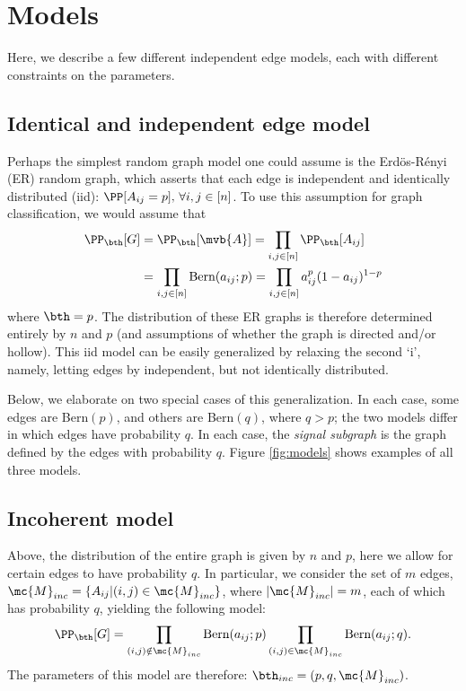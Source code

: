 \section{Models} %
\label{sub:models}

Here, we describe a few different independent edge models, each with different constraints on the parameters.


\subsection{Identical and independent edge model} %
\label{sub:ER}


Perhaps the simplest random graph model one could assume is the Erd\"os-R\'enyi (ER) random graph, which asserts that each edge is independent and identically distributed (iid): $\PP[A_{ij}=p], \, \forall i,j \in [n]$.  To use this assumption for graph classification, we would assume that 
\begin{align}
	\PP_{\bth}[G]&=\PP_{\bth}[\mvb{A}]=\prod_{i,j \in [n]} \PP_{\bth}[A_{ij}] %
	\nonumber \\&= \prod_{i,j \in [n]} \text{Bern}(a_{ij}; p) = \prod_{i,j \in [n]} a_{ij}^{p}(1-a_{ij})^{1-p}
\end{align}
where $\bth=p$.  The distribution of these ER graphs is therefore determined entirely by $n$ and $p$ (and assumptions of whether the graph is directed and/or hollow).  This iid model can be easily generalized by relaxing the second `i', namely, letting edges by independent, but not identically distributed.  

Below, we elaborate on two special cases of this generalization.  In each case, some edges are Bern$(p)$, and others are Bern$(q)$, where $q>p$; the two models differ in which edges have probability $q$. In each case, the \emph{signal subgraph} is the graph defined by the edges with probability $q$.  Figure \ref{fig:models} shows examples of all three models.


\subsection{Incoherent model} %
\label{ssub:incoherent_subspace}

Above, the distribution of the entire graph is given by $n$ and $p$, here we allow for certain edges to have probability $q$.  In particular, we consider the set of $m$ edges, $\mc{M}_{inc}=\{A_{ij} | (i,j) \in \mc{M}_{inc}\}$, where $|\mc{M}_{inc}|=m$, each of which has probability $q$, yielding the following model:
\begin{equation} \label{eq:M_i}
	\PP_{\bth}[G] = \prod_{(i,j) \notin \mc{M}_{inc}} \text{Bern}(a_{ij}; p) \prod_{(i,j) \in \mc{M}_{inc}} \text{Bern}(a_{ij}; q).
\end{equation}
The parameters of this model are therefore: $\bth_{inc}=(p,q,\mc{M}_{inc})$.



